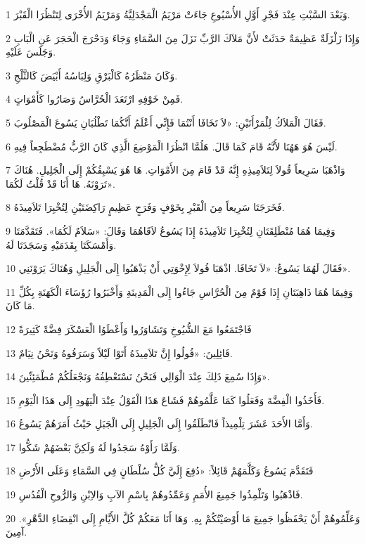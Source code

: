 \par 1 وَبَعْدَ السَّبْتِ عِنْدَ فَجْرِ أَوَّلِ الأُسْبُوعِ جَاءَتْ مَرْيَمُ الْمَجْدَلِيَّةُ وَمَرْيَمُ الأُخْرَى لِتَنْظُرَا الْقَبْرَ.
\par 2 وَإِذَا زَلْزَلَةٌ عَظِيمَةٌ حَدَثَتْ لأَنَّ مَلاَكَ الرَّبِّ نَزَلَ مِنَ السَّمَاءِ وَجَاءَ وَدَحْرَجَ الْحَجَرَ عَنِ الْبَابِ وَجَلَسَ عَلَيْهِ.
\par 3 وَكَانَ مَنْظَرُهُ كَالْبَرْقِ وَلِبَاسُهُ أَبْيَضَ كَالثَّلْجِ.
\par 4 فَمِنْ خَوْفِهِ ارْتَعَدَ الْحُرَّاسُ وَصَارُوا كَأَمْوَاتٍ.
\par 5 فَقَالَ الْمَلاَكُ لِلْمَرْأَتَيْنِ: «لاَ تَخَافَا أَنْتُمَا فَإِنِّي أَعْلَمُ أَنَّكُمَا تَطْلُبَانِ يَسُوعَ الْمَصْلُوبَ.
\par 6 لَيْسَ هُوَ هَهُنَا لأَنَّهُ قَامَ كَمَا قَالَ. هَلُمَّا انْظُرَا الْمَوْضِعَ الَّذِي كَانَ الرَّبُّ مُضْطَجِعاً فِيهِ.
\par 7 وَاذْهَبَا سَرِيعاً قُولاَ لِتَلاَمِيذِهِ إِنَّهُ قَدْ قَامَ مِنَ الأَمْوَاتِ. هَا هُوَ يَسْبِقُكُمْ إِلَى الْجَلِيلِ. هُنَاكَ تَرَوْنَهُ. هَا أَنَا قَدْ قُلْتُ لَكُمَا».
\par 8 فَخَرَجَتَا سَرِيعاً مِنَ الْقَبْرِ بِخَوْفٍ وَفَرَحٍ عَظِيمٍ رَاكِضَتَيْنِ لِتُخْبِرَا تَلاَمِيذَهُ.
\par 9 وَفِيمَا هُمَا مُنْطَلِقَتَانِ لِتُخْبِرَا تَلاَمِيذَهُ إِذَا يَسُوعُ لاَقَاهُمَا وَقَالَ: «سَلاَمٌ لَكُمَا». فَتَقَدَّمَتَا وَأَمْسَكَتَا بِقَدَمَيْهِ وَسَجَدَتَا لَهُ.
\par 10 فَقَالَ لَهُمَا يَسُوعُ: «لاَ تَخَافَا. اذْهَبَا قُولاَ لِإِخْوَتِي أَنْ يَذْهَبُوا إِلَى الْجَلِيلِ وَهُنَاكَ يَرَوْنَنِي».
\par 11 وَفِيمَا هُمَا ذَاهِبَتَانِ إِذَا قَوْمٌ مِنَ الْحُرَّاسِ جَاءُوا إِلَى الْمَدِينَةِ وَأَخْبَرُوا رُؤَسَاءَ الْكَهَنَةِ بِكُلِّ مَا كَانَ.
\par 12 فَاجْتَمَعُوا مَعَ الشُّيُوخِ وَتَشَاوَرُوا وَأَعْطَوُا الْعَسْكَرَ فِضَّةً كَثِيرَةً
\par 13 قَائِلِينَ: «قُولُوا إِنَّ تَلاَمِيذَهُ أَتَوْا لَيْلاً وَسَرَقُوهُ وَنَحْنُ نِيَامٌ.
\par 14 وَإِذَا سُمِعَ ذَلِكَ عِنْدَ الْوَالِي فَنَحْنُ نَسْتَعْطِفُهُ وَنَجْعَلُكُمْ مُطْمَئِنِّينَ».
\par 15 فَأَخَذُوا الْفِضَّةَ وَفَعَلُوا كَمَا عَلَّمُوهُمْ فَشَاعَ هَذَا الْقَوْلُ عِنْدَ الْيَهُودِ إِلَى هَذَا الْيَوْمِ.
\par 16 وَأَمَّا الأَحَدَ عَشَرَ تِلْمِيذاً فَانْطَلَقُوا إِلَى الْجَلِيلِ إِلَى الْجَبَلِ حَيْثُ أَمَرَهُمْ يَسُوعُ.
\par 17 وَلَمَّا رَأَوْهُ سَجَدُوا لَهُ وَلَكِنَّ بَعْضَهُمْ شَكُّوا.
\par 18 فَتَقَدَّمَ يَسُوعُ وَكَلَّمَهُمْ قَائِلاً: «دُفِعَ إِلَيَّ كُلُّ سُلْطَانٍ فِي السَّمَاءِ وَعَلَى الأَرْضِ
\par 19 فَاذْهَبُوا وَتَلْمِذُوا جَمِيعَ الأُمَمِ وَعَمِّدُوهُمْ بِاسْمِ الآبِ وَالاِبْنِ وَالرُّوحِ الْقُدُسِ.
\par 20 وَعَلِّمُوهُمْ أَنْ يَحْفَظُوا جَمِيعَ مَا أَوْصَيْتُكُمْ بِهِ. وَهَا أَنَا مَعَكُمْ كُلَّ الأَيَّامِ إِلَى انْقِضَاءِ الدَّهْرِ». آمِينَ.



